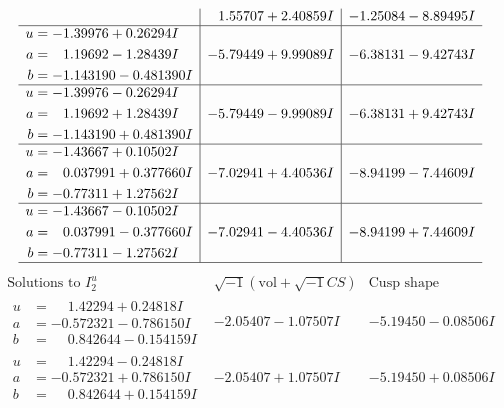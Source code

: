 \documentclass[1p]{elsarticle_modified}
\theoremstyle{definition}
\newcommand{\I}{\sqrt{-1}}
\begin{document}
$$\begin{array}{c|c|c}
 & \phantom{-}1.55707 + 2.40859 I & -1.25084 - 8.89495 I \\ \hline\begin{aligned}
u &= -1.39976 + 0.26294 I \\
a &= \phantom{-}1.19692 - 1.28439 I \\
b &= -1.143190 - 0.481390 I\end{aligned}
 & -5.79449 + 9.99089 I & -6.38131 - 9.42743 I \\ \hline\begin{aligned}
u &= -1.39976 - 0.26294 I \\
a &= \phantom{-}1.19692 + 1.28439 I \\
b &= -1.143190 + 0.481390 I\end{aligned}
 & -5.79449 - 9.99089 I & -6.38131 + 9.42743 I \\ \hline\begin{aligned}
u &= -1.43667 + 0.10502 I \\
a &= \phantom{-}0.037991 + 0.377660 I \\
b &= -0.77311 + 1.27562 I\end{aligned}
 & -7.02941 + 4.40536 I & -8.94199 - 7.44609 I \\ \hline\begin{aligned}
u &= -1.43667 - 0.10502 I \\
a &= \phantom{-}0.037991 - 0.377660 I \\
b &= -0.77311 - 1.27562 I\end{aligned}
 & -7.02941 - 4.40536 I & -8.94199 + 7.44609 I\\
 \hline 
 \end{array}$$\newpage$$\begin{array}{c|c|c}  
\text{Solutions to }I^u_{2}& \I (\text{vol} + \sqrt{-1}CS) & \text{Cusp shape}\\
 \hline 
\begin{aligned}
u &= \phantom{-}1.42294 + 0.24818 I \\
a &= -0.572321 - 0.786150 I \\
b &= \phantom{-}0.842644 - 0.154159 I\end{aligned}
 & -2.05407 - 1.07507 I & -5.19450 - 0.08506 I \\ \hline\begin{aligned}
u &= \phantom{-}1.42294 - 0.24818 I \\
a &= -0.572321 + 0.786150 I \\
b &= \phantom{-}0.842644 + 0.154159 I\end{aligned}
 & -2.05407 + 1.07507 I & -5.19450 + 0.08506 I \\ \hline\begin{aligned}

\end{aligned}
\end{array}$$
\end{document}
